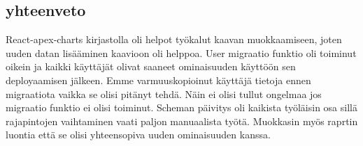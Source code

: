 \subsection*{yhteenveto}

React-apex-charts kirjastolla oli helpot työkalut kaavan muokkaamiseen, joten uuden datan lisääminen kaavioon oli helppoa.
User migraatio funktio oli toiminut oikein ja kaikki käyttäjät olivat saaneet ominaisuuden käyttöön sen deployaamisen jälkeen.
Emme varmuuskopioinut käyttäjä tietoja ennen migraatiota vaikka se olisi pitänyt tehdä. Näin ei olisi tullut ongelmaa jos migraatio funktio ei olisi toiminut.
Scheman päivitys oli kaikista työläisin osa sillä rajapintojen vaihtaminen vaati paljon manuaalista työtä.
Muokkasin myös raprtin luontia että se olisi yhteensopiva uuden ominaisuuden kanssa.




